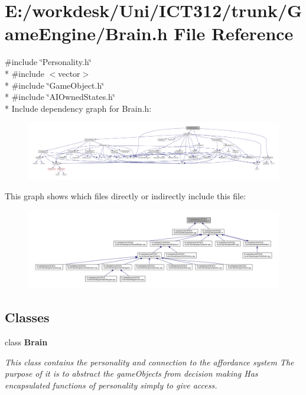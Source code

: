 \section{E\+:/workdesk/\+Uni/\+I\+C\+T312/trunk/\+Game\+Engine/\+Brain.h File Reference}
\label{_brain_8h}
{\ttfamily \#include \char`\"{}Personality.\+h\char`\"{}}\\*
{\ttfamily \#include $<$vector$>$}\\*
{\ttfamily \#include \char`\"{}Game\+Object.\+h\char`\"{}}\\*
{\ttfamily \#include \char`\"{}A\+I\+Owned\+States.\+h\char`\"{}}\\*
Include dependency graph for Brain.\+h\+:\nopagebreak
\begin{figure}[H]
\begin{center}
\leavevmode
\includegraphics[width=350pt]{d0/dc2/_brain_8h__incl}
\end{center}
\end{figure}
This graph shows which files directly or indirectly include this file\+:
\nopagebreak
\begin{figure}[H]
\begin{center}
\leavevmode
\includegraphics[width=350pt]{d2/d2f/_brain_8h__dep__incl}
\end{center}
\end{figure}
\subsection*{Classes}
\begin{DoxyCompactItemize}
\item 
class {\bf Brain}
\begin{DoxyCompactList}\small\item\em This class contains the personality and connection to the affordance system The purpose of it is to abstract the game\+Objects from decision making Has encapsulated functions of personality simply to give access. \end{DoxyCompactList}\end{DoxyCompactItemize}
